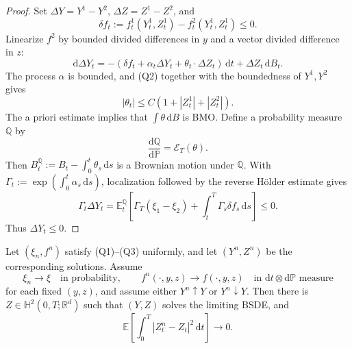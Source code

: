 \begin{proof}
Set
$\Delta Y=Y^1-Y^2$, $\Delta Z=Z^1-Z^2$, and
\[
  \delta f_t:=f_t^1(Y_t^1,Z_t^1)-f_t^2(Y_t^1,Z_t^1)\le0.
\]
Linearize $f^2$ by bounded divided differences in $y$ and a vector
divided difference in $z$:
\[
  \mathrm d\Delta Y_t
  =-(\delta f_t+\alpha_t\Delta Y_t+\theta_t\cdot\Delta Z_t)\,\mathrm dt
    +\Delta Z_t\,\mathrm dB_t.
\]
The process $\alpha$ is bounded, and \textup{(Q2)} together with the
boundedness of $Y^1,Y^2$ gives
\[
  |\theta_t|\le C(1+|Z_t^1|+|Z_t^2|).
\]
The a priori estimate implies that
$\int\theta\,\mathrm dB$ is BMO\@.  Define a probability measure
$\mathbb Q$ by
\[
  \frac{\mathrm d\mathbb Q}{\mathrm d\mathbb P}
  =\mathcal E_T(\theta).
\]
Then $B_t^{\mathbb Q}:=B_t-\int_0^t\theta_s\,\mathrm ds$ is a Brownian
motion under $\mathbb Q$.  With
$\Gamma_t:=\exp(\int_0^t\alpha_s\,\mathrm ds)$, localization followed by
the reverse H\"older estimate gives
\[
  \Gamma_t\Delta Y_t
  =\mathbb E_t^{\mathbb Q}\!\left[
    \Gamma_T(\xi_1-\xi_2)
    +\int_t^T\Gamma_s\delta f_s\,\mathrm ds
  \right]\le0.
\]
Thus $\Delta Y_t\le0$.
\end{proof}

\begin{lem}
Let $(\xi_n,f^n)$ satisfy \textup{(Q1)}--\textup{(Q3)} uniformly, and let
$(Y^n,Z^n)$ be the corresponding solutions.  Assume
\[
  \xi_n\to\xi\quad\text{in probability},
  \qquad
  f^n(\cdot,y,z)\to f(\cdot,y,z)
  \quad\text{in }\mathrm dt\otimes\mathrm d\mathbb P\text{ measure}
\]
for each fixed $(y,z)$, and assume either $Y^n\uparrow Y$ or
$Y^n\downarrow Y$.  Then there is
$Z\in\mathbb H^2(0,T;\mathbb R^d)$ such that $(Y,Z)$ solves the limiting
BSDE, and
\[
  \mathbb E\!\left[
    \int_0^T|Z_t^n-Z_t|^2\,\mathrm dt
  \right]\longrightarrow0.
\]
\end{lem}

